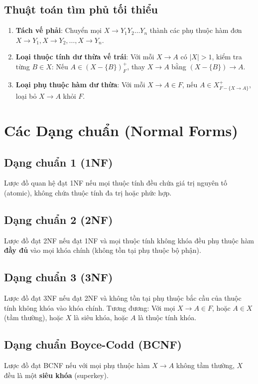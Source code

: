 \subsection{Thuật toán tìm phủ tối thiểu}
\begin{enumerate}
    \item \textbf{Tách vế phải}: Chuyển mọi $X \rightarrow Y_1Y_2\ldots Y_n$ thành các phụ thuộc hàm đơn $X \rightarrow Y_1, X \rightarrow Y_2, \ldots, X \rightarrow Y_n$.
    \item \textbf{Loại thuộc tính dư thừa vế trái}: Với mỗi $X \rightarrow A$ có $|X| > 1$, kiểm tra từng $B \in X$: Nếu $A \in (X - \{B\})^+_F$, thay $X \rightarrow A$ bằng $(X - \{B\}) \rightarrow A$.
    \item \textbf{Loại phụ thuộc hàm dư thừa}: Với mỗi $X \rightarrow A \in F$, nếu $A \in X^+_{F - \{X \rightarrow A\}}$, loại bỏ $X \rightarrow A$ khỏi $F$.
\end{enumerate}

\section{Các Dạng chuẩn (Normal Forms)}

\subsection{Dạng chuẩn 1 (1NF)}
Lược đồ quan hệ đạt 1NF nếu mọi thuộc tính đều chứa giá trị nguyên tố (atomic), không chứa thuộc tính đa trị hoặc phức hợp.

\subsection{Dạng chuẩn 2 (2NF)}
Lược đồ đạt 2NF nếu đạt 1NF và mọi thuộc tính không khóa đều phụ thuộc hàm \textbf{đầy đủ} vào mọi khóa chính (không tồn tại phụ thuộc bộ phận).

\subsection{Dạng chuẩn 3 (3NF)}
Lược đồ đạt 3NF nếu đạt 2NF và không tồn tại phụ thuộc bắc cầu của thuộc tính không khóa vào khóa chính. Tương đương: Với mọi $X \rightarrow A \in F$, hoặc $A \in X$ (tầm thường), hoặc $X$ là siêu khóa, hoặc $A$ là thuộc tính khóa.

\subsection{Dạng chuẩn Boyce-Codd (BCNF)}
Lược đồ đạt BCNF nếu với mọi phụ thuộc hàm $X \rightarrow A$ không tầm thường, $X$ đều là một \textbf{siêu khóa} (superkey).

